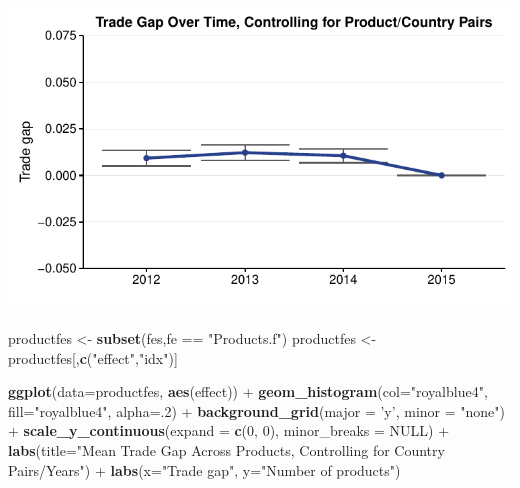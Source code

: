 \documentclass[10pt,]{article}
\newenvironment{Shaded}{\begin{snugshade}}{\end{snugshade}}
\newcommand{\KeywordTok}[1]{\textcolor[rgb]{0.13,0.29,0.53}{\textbf{{#1}}}}
\newcommand{\DataTypeTok}[1]{\textcolor[rgb]{0.13,0.29,0.53}{{#1}}}
\newcommand{\DecValTok}[1]{\textcolor[rgb]{0.00,0.00,0.81}{{#1}}}
\newcommand{\StringTok}[1]{\textcolor[rgb]{0.31,0.60,0.02}{{#1}}}
\newcommand{\OtherTok}[1]{\textcolor[rgb]{0.56,0.35,0.01}{{#1}}}
\newcommand{\NormalTok}[1]{{#1}}
\begin{document}
\begin{center}\includegraphics{Figs/value_summary-10} \end{center}

\begin{Shaded}
\begin{Highlighting}[]
\NormalTok{productfes <-}\StringTok{ }\KeywordTok{subset}\NormalTok{(fes,fe ==}\StringTok{ "Products.f"}\NormalTok{)}
\NormalTok{productfes <-}\StringTok{ }\NormalTok{productfes[,}\KeywordTok{c}\NormalTok{(}\StringTok{"effect"}\NormalTok{,}\StringTok{"idx"}\NormalTok{)]}

\KeywordTok{ggplot}\NormalTok{(}\DataTypeTok{data=}\NormalTok{productfes, }\KeywordTok{aes}\NormalTok{(effect)) +}
\StringTok{  }\KeywordTok{geom_histogram}\NormalTok{(}\DataTypeTok{col=}\StringTok{"royalblue4"}\NormalTok{,}
                 \DataTypeTok{fill=}\StringTok{"royalblue4"}\NormalTok{,}
                 \DataTypeTok{alpha=}\NormalTok{.}\DecValTok{2}\NormalTok{) +}
\StringTok{  }\KeywordTok{background_grid}\NormalTok{(}\DataTypeTok{major =} \StringTok{'y'}\NormalTok{, }\DataTypeTok{minor =} \StringTok{"none"}\NormalTok{) +}
\StringTok{  }\KeywordTok{scale_y_continuous}\NormalTok{(}\DataTypeTok{expand =} \KeywordTok{c}\NormalTok{(}\DecValTok{0}\NormalTok{, }\DecValTok{0}\NormalTok{), }\DataTypeTok{minor_breaks =} \OtherTok{NULL}\NormalTok{) +}
\StringTok{  }\KeywordTok{labs}\NormalTok{(}\DataTypeTok{title=}\StringTok{"Mean Trade Gap Across Products, Controlling for Country Pairs/Years"}\NormalTok{) +}
\StringTok{  }\KeywordTok{labs}\NormalTok{(}\DataTypeTok{x=}\StringTok{"Trade gap"}\NormalTok{, }\DataTypeTok{y=}\StringTok{"Number of products"}\NormalTok{)}
\end{Highlighting}
\end{Shaded}
\end{document}
